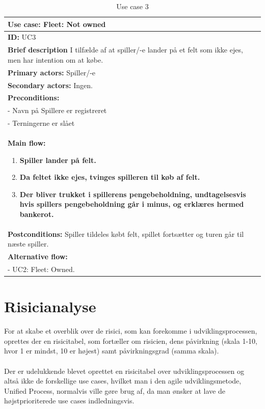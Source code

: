 \begin{table}[H]
    \begin{center}
        \begin{tabular}{ | p{15cm} |}
            \hline
            \textbf{Use case:} Fleet: Not owned \\ \hline
            \textbf{ID:} UC3 \\ \hline
            \textbf{Brief description} I tilfælde af at spiller/-e lander på et felt som ikke ejes, men har intention om at købe.    \\ \hline
            \textbf{Primary actors:} Spiller/-e \\ \hline
            \textbf{Secondary actors:} Ingen. \\ \hline
            \textbf{Preconditions:}
            \\- Navn på Spillere er registreret
            \\- Terningerne er slået \\ \hline
            \textbf{Main flow:}
            \begin{enumerate}
                \item \textbf{Spiller lander på felt.}
                \item \textbf{Da feltet ikke ejes, tvinges spilleren til køb af felt.}
                \item \textbf{Der bliver trukket i spillerens pengebeholdning, undtagelsesvis hvis spillers pengebeholdning går i minus, og erklæres hermed bankerot.}
            \end{enumerate} \\ \hline
            \textbf{Postconditions:} Spiller tildeles købt felt, spillet fortsætter og turen går til næste spiller.\\ \hline
            \textbf{Alternative flow:}
            \\- UC2: Fleet: Owned.\\ \hline
            \hline
        \end{tabular}
        \caption{Use case 3}
        \label{usecase:3}
    \end{center}
\end{table}

\newpage
\section{Risicianalyse}
For at skabe et overblik over de risici, som kan forekomme i udviklingsprocessen, oprettes der en risicitabel, som fortæller om risicien, dens påvirkning (skala 1-10, hvor 1 er mindst, 10 er højest) samt påvirkningsgrad (samma skala). \\ \\
Der er udelukkende blevet oprettet en risicitabel over udviklingsprocessen og altså ikke de forskellige use cases, hvilket man i den agile udviklingsmetode, Unified Process, normalvis ville gøre brug af, da man ønsker at lave de højstprioriterede use cases indledningsvis.

